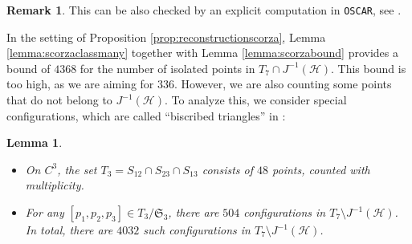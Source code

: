 \documentclass[12pt]{article}
\newtheorem{lemma}[theorem]{Lemma}
\numberwithin{equation}{section}
\theoremstyle{definition}
\newtheorem{remark}[theorem]{Remark}
\begin{document}
\begin{remark}
	This can be also checked by an explicit computation in \texttt{OSCAR}, see \cite{code}.
\end{remark} 

In the setting of Proposition \ref{prop:reconstructionscorza}, Lemma \ref{lemma:scorzaclassmany} together with Lemma \ref{lemma:scorzabound} provides a bound of $4368$ for the number of isolated points in $T_7\cap J^{-1}(\mathcal{H})$. This bound is too high, as we are aiming for $336$. However, we are also counting some points that do not belong to $J^{-1}(\mathcal{H})$. To analyze this, we consider special configurations, which are called \enquote{biscribed triangles} in \cite{Mukai}:

\begin{lemma}\label{lemma:scorzatriangles} 
\begin{itemize}
	\item[(1)] On $C^3$, the set $T_3 = S_{12}\cap S_{23} \cap S_{13}$ consists of $48$ points, counted with multiplicity.
	\item[(2)] For any $[p_1,p_2,p_3]\in T_3/\mathfrak{S}_3$, there are $504$ configurations in $T_7\setminus J^{-1}(\mathcal{H})$. In total, there are $4032$ such configurations in $T_7\setminus J^{-1}(\mathcal{H})$.
\end{itemize}
\end{lemma}
\end{document}
